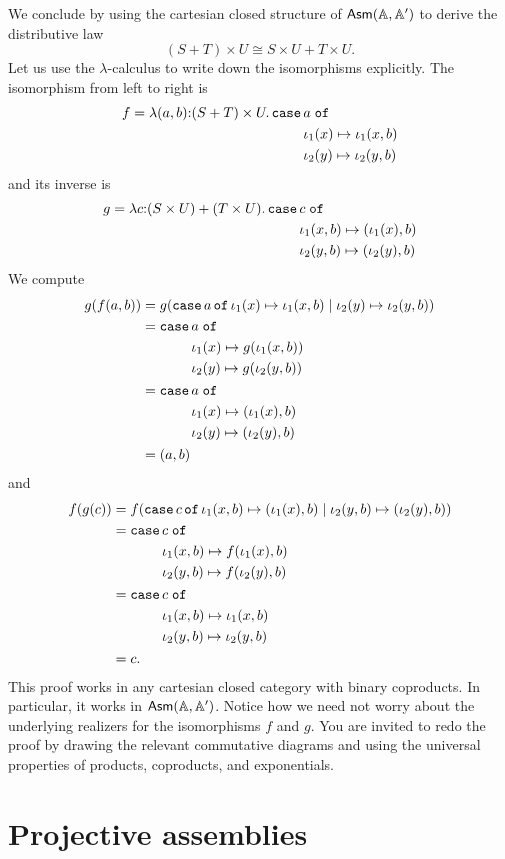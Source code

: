 We conclude by using the cartesian closed structure of $\mathsf{Asm}(\mathbb{A},\mathbb{A}')$ to
derive the distributive law
%
\begin{equation*}
  (S + T) \times U \cong
  S \times U + T \times U.
\end{equation*}
%
Let us use the $\lambda$-calculus to write down the isomorphisms
explicitly. The isomorphism from left to right is
%
\begin{equation*}
  f = \lam{(a,b) \of (S + T) \times U}{
    \xcase{a}
    {\iota_1(x)}{\iota_1(x, b)}
    {\iota_2(y)}{\iota_2(y, b)}
  }
\end{equation*}
%
and its inverse is
%
\begin{equation*}
  g = \lam{c \of (S \times U) + (T \times U)}{
    \xcase{c}
    {\iota_1(x,b)}{(\iota_1(x), b)}
    {\iota_2(y,b)}{(\iota_2(y), b)}
  }
\end{equation*}
%
We compute
%
\begin{align*}
  g(f(a, b)) &=
  g(\mathtt{case}\,a\,\mathtt{of}\,\iota_1(x) \mapsto \iota_1(x, b) \mid \iota_2(y) \mapsto \iota_2(y, b)) \\
  &=
  \begin{aligned}[t]\mathtt{case}\,&a\;\mathtt{of}\\&\iota_1(x) \mapsto g(\iota_1(x, b)) \\&\iota_2(y) \mapsto g(\iota_2(y, b))\end{aligned} \\
  &=
  \begin{aligned}[t]\mathtt{case}\,&a\;\mathtt{of}\\&\iota_1(x) \mapsto (\iota_1(x), b) \\&\iota_2(y) \mapsto (\iota_2(y), b)\end{aligned} \\
  &=
  (a,b)
\end{align*}
%
and
\begin{align*}
  f(g(c)) &=
  f(
    \mathtt{case}\,c\,\mathtt{of}\,\iota_1(x,b) \mapsto (\iota_1(x), b) \mid \iota_2(y,b) \mapsto (\iota_2(y), b)
  )
  \\
  &=
  \begin{aligned}[t]\mathtt{case}\,&c\;\mathtt{of}\\&\iota_1(x,b) \mapsto f(\iota_1(x), b) \\&\iota_2(y,b) \mapsto f(\iota_2(y), b)\end{aligned}
  \\
  &=
  \begin{aligned}[t]\mathtt{case}\,&c\;\mathtt{of}\\&\iota_1(x,b) \mapsto \iota_1(x, b) \\&\iota_2(y,b) \mapsto \iota_2(y, b)\end{aligned} \\
  &=
  c.
\end{align*}
%
This proof works in any cartesian closed category with binary
coproducts. In particular, it works in $\mathsf{Asm}(\mathbb{A},\mathbb{A}')$. Notice how we need not
worry about the underlying realizers for the isomorphisms $f$ and $g$.
You are invited to redo the proof by drawing the relevant commutative
diagrams and using the universal properties of products, coproducts,
and exponentials.

\section{Projective assemblies}
\label{sec:projective-assemblies}

